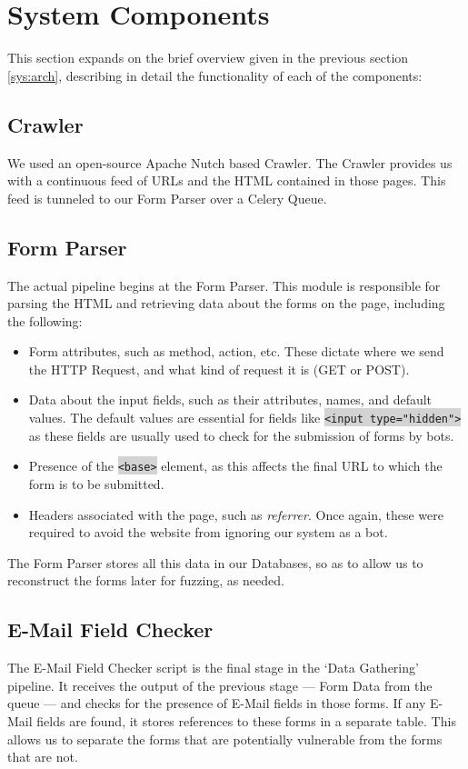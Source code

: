 \section{System Components}
\label{Comp}

This section expands on the brief overview given in the previous section \ref{sys:arch}, describing in detail the functionality of each of the components:

\subsection{Crawler}
\label{Comp:Crawler}
We used an open-source Apache Nutch based Crawler. The Crawler provides us with a continuous feed of URLs and the HTML contained in those pages. This feed is tunneled to our Form Parser over a Celery Queue.

\subsection{Form Parser}
\label{Comp:FP}
The actual pipeline begins at the Form Parser. This module is responsible for parsing the HTML and retrieving data about the forms on the page, including the following:
\begin{itemize}
	\item Form attributes, such as method, action, etc. These dictate where we send the HTTP Request, and what kind of request it is (GET or POST).
	\item Data about the input fields, such as their attributes, names, and default values. The default values are essential for fields like \colorbox{lightgray}{\lstinline{<input type="hidden">}} as these fields are usually used to check for the submission of forms by bots.
	\item Presence of the \colorbox{lightgray}{\lstinline{<base>}} element, as this affects the final URL to which the form is to be submitted.
	\item Headers associated with the page, such as \emph{referrer}. Once again, these were required to avoid the website from ignoring our system as a bot.
\end{itemize} 
The Form Parser stores all this data in our Databases, so as to allow us to reconstruct the forms later for fuzzing, as needed.

\subsection{E-Mail Field Checker}
\label{Comp:EMFC}
The E-Mail Field  Checker script is the final stage in the `Data Gathering' pipeline. It receives the output of the previous stage --- Form Data from the queue --- and checks for the presence of E-Mail fields in those forms. If any E-Mail fields are found, it stores references to these forms in a separate table. This allows us to separate the forms that are potentially vulnerable from the forms that are not.

